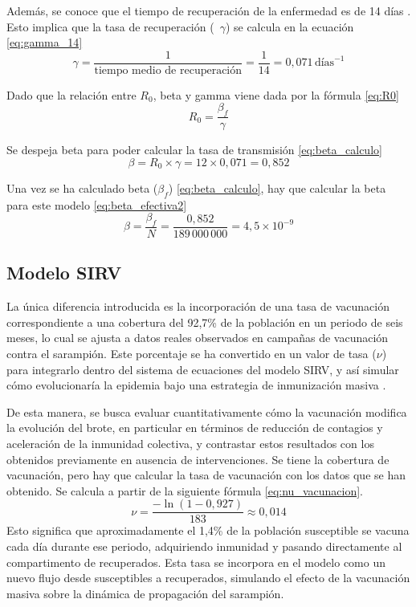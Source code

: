 Además, se conoce que el tiempo de recuperación de la enfermedad es de 14 días \cite{ops_sarampion}. Esto implica que la tasa de recuperación (~$\gamma$) se calcula en la ecuación \eqref{eq:gamma_14}
\begin{equation}
\gamma = \frac{1}{\text{tiempo medio de recuperación}} = \frac{1}{14} = 0{,}071 \,\text{días}^{-1}
\label{eq:gamma_14}
\end{equation}

Dado que la relación entre $R_0$, beta y gamma viene dada por la fórmula \eqref{eq:R0}
\begin{equation}
R_0 = \frac{\beta_f}{\gamma}
\label{eq:R0}
\end{equation}

Se despeja beta para poder calcular la tasa de transmisión \eqref{eq:beta_calculo}
\begin{equation}
\beta = R_0 \times \gamma = 12 \times 0{,}071 = 0{,}852
\label{eq:beta_calculo}
\end{equation}

Una vez se ha calculado beta ($\beta_f$) \eqref{eq:beta_calculo}, hay que calcular la beta para este modelo \eqref{eq:beta_efectiva2}
\begin{equation}
\beta = \frac{\beta_f}{N} = \frac{0{,}852}{189\,000\,000} = 4{,}5 \times 10^{-9}
\label{eq:beta_efectiva2}
\end{equation}

\subsection{Modelo SIRV}
La única diferencia introducida es la incorporación de una tasa de vacunación correspondiente a una cobertura del 92,7\% de la población en un periodo de seis meses, lo cual se ajusta a datos reales observados en campañas de vacunación contra el sarampión. Este porcentaje se ha convertido en un valor de tasa ($\nu$) para integrarlo dentro del sistema de ecuaciones del modelo SIRV, y así simular cómo evolucionaría la epidemia bajo una estrategia de inmunización masiva \cite{cdc_measles_cases_2025}.

De esta manera, se busca evaluar cuantitativamente cómo la vacunación modifica la evolución del brote, en particular en términos de reducción de contagios y aceleración de la inmunidad colectiva, y contrastar estos resultados con los obtenidos previamente en ausencia de intervenciones.
Se tiene la cobertura de vacunación, pero hay que calcular la tasa de vacunación con los datos que se han obtenido. Se calcula a partir de la siguiente fórmula \eqref{eq:nu_vacunacion}. 
\begin{equation}
\nu = \frac{-\ln(1 - 0{,}927)}{183} \approx 0{,}014
\label{eq:nu_vacunacion}
\end{equation}
Esto significa que aproximadamente el 1,4\% de la población susceptible se vacuna cada día durante ese periodo, adquiriendo inmunidad y pasando directamente al compartimento de recuperados. Esta tasa se incorpora en el modelo como un nuevo flujo desde susceptibles a recuperados, simulando el efecto de la vacunación masiva sobre la dinámica de propagación del sarampión.






